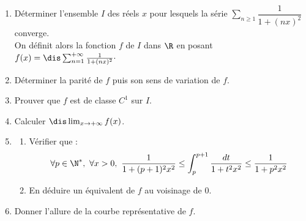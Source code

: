 \documentclass[a4paper,10pt]{report}
\newcommand{\Sum}[2]{\ensuremath{\textstyle{\sum\limits_{#1}^{#2}}}}
\begin{document}
\begin{Exercice}{} \begin{enumerate}
\item D\'eterminer l'ensemble $I$ des r\'eels $x$ pour lesquels la s\'erie $\Sum{n\geq 1}{} \dfrac{1}{1+(nx)^2}$ converge.\\
On d\'efinit alors la fonction $f$ de $I$ dans $\R$ en posant $f(x)=\dis \sum_{n=1}^{+\infty}\frac{1}{1+(nx)^2}\cdot$
\item D\'eterminer la parité de $f$ puis son sens de variation de $f$. 
\item Prouver que $f$ est de classe $C^1$ sur $I$.
\item Calculer $\dis \lim_{x\to +\infty}f(x)$.
\item
\begin{enumerate}
\item V\'erifier que :
\[\forall p\in \N^*,\ \forall x >0,\ \frac{1}{1+(p+1)^2x^2}\leq \int_p^{p+1}\frac{dt}{1+t^2x^2}\leq \frac{1}{1+p^2x^2}\] 
\item En d\'eduire un \'equivalent de $f$ au voisinage de $0$.
\end{enumerate}
\item Donner l'allure de la courbe repr\'esentative de $f$.
\end{enumerate}
\end{Exercice}
\end{document}
